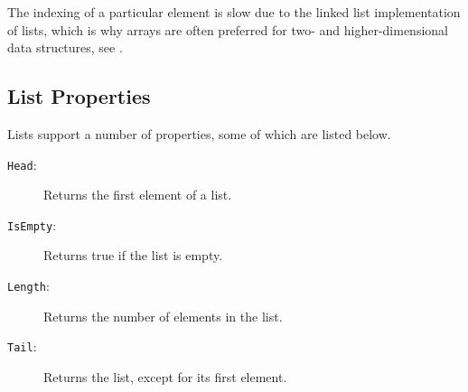  The indexing of a particular element is slow due to the linked list implementation of lists, which is why arrays are often preferred for two- and higher-dimensional data structures, see .

\subsection{List Properties}
Lists support a number of properties, some of which are listed below.
\begin{description}
\item[\texttt{Head}:] Returns the first element of a list.
\item[\texttt{IsEmpty}:] Returns true if the list is empty.
\item[\texttt{Length}:] Returns the number of elements in the list.
\item[\texttt{Tail}:] Returns the list, except for its first element.
\end{description}

